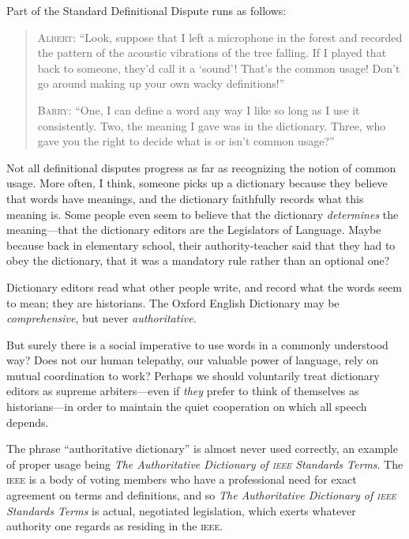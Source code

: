 {{

{
 Part of the Standard Definitional Dispute runs as follows:}

\begin{quotation}
{
 \textsc{Albert}: ``Look, suppose that I left a microphone
in the forest and recorded the pattern of the acoustic vibrations of
the tree falling. If I played that back to someone,
they'd call it a
`sound'! That's the
common usage! Don't go around making up your own wacky
definitions!''}

{
 \textsc{Barry}: ``One, I can define a word any way I like
so long as I use it consistently. Two, the meaning I gave was in the
dictionary. Three, who gave you the right to decide what is or
isn't common usage?''}
\end{quotation}

{
 Not all definitional disputes progress as far as recognizing the
notion of common usage. More often, I think, someone picks up a
dictionary because they believe that words have meanings, and the
dictionary faithfully records what this meaning is. Some people even
seem to believe that the dictionary \textit{determines} the
meaning---that the dictionary editors are the Legislators of Language.
Maybe because back in elementary school, their authority-teacher said
that they had to obey the dictionary, that it was a mandatory rule
rather than an optional one?}

{
 Dictionary editors read what other people write, and record what
the words seem to mean; they are historians. The Oxford English
Dictionary may be \textit{comprehensive}, but never
\textit{authoritative.}}

{
 But surely there is a social imperative to use words in a commonly
understood way? Does not our human telepathy, our valuable power of
language, rely on mutual coordination to work? Perhaps we should
voluntarily treat dictionary editors as supreme arbiters---even if
\textit{they} prefer to think of themselves as historians---in order to
maintain the quiet cooperation on which all speech depends.}

{
 The phrase ``authoritative
dictionary'' is almost never used correctly, an
example of proper usage being \textit{The Authoritative Dictionary of
\textsc{ieee} Standards Terms}. The \textsc{ieee} is a body of voting members who have a
professional need for exact agreement on terms and definitions, and so
\textit{The Authoritative Dictionary of \textsc{ieee} Standards Terms} is
actual, negotiated legislation, which exerts whatever authority one
regards as residing in the \textsc{ieee}.}

}}
